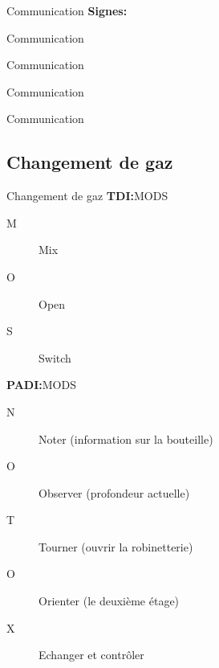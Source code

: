 \begin{frame}{Communication}  
	\textbf{Signes:}
	\vfill
\end{frame}

\begin{frame}{Communication}
	\\
\end{frame}

\begin{frame}{Communication}
	\\
\end{frame}

\begin{frame}{Communication}
\end{frame}

\begin{frame}{Communication}
	\\
\end{frame}

\subsection{Changement de gaz}

\begin{frame}{Changement de gaz}
	\textbf{TDI:}MODS
	\begin{description}
		\item[M]Mix
		\item[O]Open
		\item[S]Switch
	\end{description}
	\textbf{PADI:}MODS
	\begin{description}
		\item[N]Noter (information sur la bouteille)
		\item[O]Observer (profondeur actuelle)
		\item[T]Tourner (ouvrir la robinetterie)
		\item[O]Orienter (le deuxième étage)
		\item[X]Echanger et contrôler
	\end{description}
\end{frame}











